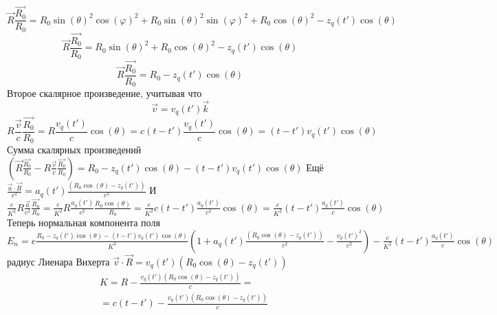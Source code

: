 \documentclass[11pt]{article}
\begin{document}
\[\overrightarrow{R}\frac{\overrightarrow{{{R}_{0}}}}{{{R}_{0}}}={{R}_{0}}\sin {{\left( \theta  \right)}^{2}}\cos {{\left( \varphi  \right)}^{2}}+{{R}_{0}}\sin {{\left( \theta  \right)}^{2}}\sin {{\left( \varphi  \right)}^{2}}+{{R}_{0}}\cos {{\left( \theta  \right)}^{2}}-{{z}_{q}}\left( t' \right)\cos \left( \theta  \right)\]
\[\overrightarrow{R}\frac{\overrightarrow{{{R}_{0}}}}{{{R}_{0}}}={{R}_{0}}\sin {{\left( \theta  \right)}^{2}}+{{R}_{0}}\cos {{\left( \theta  \right)}^{2}}-{{z}_{q}}\left( t' \right)\cos \left( \theta  \right)\]
\[\overrightarrow{R}\frac{\overrightarrow{{{R}_{0}}}}{{{R}_{0}}}={{R}_{0}}-{{z}_{q}}\left( t' \right)\cos \left( \theta  \right)\]
Второе скалярное произведение, учитывая что
\[\overrightarrow{v}={{v}_{q}}\left( t' \right)\overrightarrow{k}\]
\[R\frac{\overrightarrow{v}}{c}\frac{\overrightarrow{{{R}_{0}}}}{{{R}_{0}}}=R\frac{{{v}_{q}}\left( t' \right)}{c}\cos \left( \theta  \right)=c\left( t-t' \right)\frac{{{v}_{q}}\left( t' \right)}{c}\cos \left( \theta  \right)=\left( t-t' \right){{v}_{q}}\left( t' \right)\cos \left( \theta  \right)\]
Сумма скалярных произведений
\(\left( \overrightarrow{R}\frac{\overrightarrow{{{R}_{0}}}}{{{R}_{0}}}-R\frac{\overrightarrow{v}}{c}\frac{\overrightarrow{{{R}_{0}}}}{{{R}_{0}}} \right)={{R}_{0}}-{{z}_{q}}\left( t' \right)\cos \left( \theta \right)-\left( t-t' \right){{v}_{q}}\left( t' \right)\cos \left( \theta \right)\)
Ещё
\(\frac{\overrightarrow{a}\cdot \overrightarrow{R}}{{{c}^{2}}}={{a}_{q}}\left( t' \right)\frac{\left( {{R}_{0}}\cos \left( \theta \right)-{{z}_{q}}\left( t' \right) \right)}{{{c}^{2}}}\)
И
\(\frac{e}{{{K}^{2}}}R\frac{\overrightarrow{a}}{{{c}^{2}}}\frac{\overrightarrow{{{R}_{0}}}}{{{R}_{0}}}=\frac{e}{{{K}^{2}}}R\frac{{{a}_{q}}\left( t' \right)}{{{c}^{2}}}\frac{{{R}_{0}}\cos \left( \theta \right)}{{{R}_{0}}}=\frac{e}{{{K}^{2}}}c\left( t-t' \right)\frac{{{a}_{q}}\left( t' \right)}{{{c}^{2}}}\cos \left( \theta \right)=\frac{e}{{{K}^{2}}}\left( t-t' \right)\frac{{{a}_{q}}\left( t' \right)}{c}\cos \left( \theta \right)\)
Теперь нормальная компонента поля
\({{E}_{n}}=e\frac{{{R}_{0}}-{{z}_{q}}\left( t' \right)\cos \left( \theta \right)-\left( t-t' \right){{v}_{q}}\left( t' \right)\cos \left( \theta \right)}{{{K}^{3}}}\left( 1+{{a}_{q}}\left( t' \right)\frac{\left( {{R}_{0}}\cos \left( \theta \right)-{{z}_{q}}\left( t' \right) \right)}{{{c}^{2}}}-\frac{{{v}_{q}}{{\left( t' \right)}^{2}}}{{{c}^{2}}} \right)-\frac{e}{{{K}^{2}}}\left( t-t' \right)\frac{{{a}_{q}}\left( t' \right)}{c}\cos \left( \theta \right)\)
радиус Лиенара Вихерта
\(\overrightarrow{v}\cdot \overrightarrow{R}={{v}_{q}}\left( t' \right)\left( {{R}_{0}}\cos \left( \theta \right)-{{z}_{q}}\left( t' \right) \right)\)
\[\begin{align}
  & K=R-\frac{{{v}_{q}}\left( t' \right)\left( {{R}_{0}}\cos \left( \theta  \right)-{{z}_{q}}\left( t' \right) \right)}{c}= \\ 
 & =c\left( t-t' \right)-\frac{{{v}_{q}}\left( t' \right)\left( {{R}_{0}}\cos \left( \theta  \right)-{{z}_{q}}\left( t' \right) \right)}{c} \\ 
\end{align}\]
\end{document}
